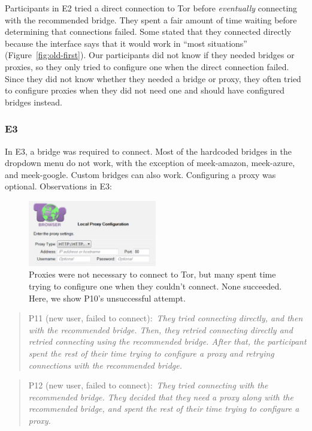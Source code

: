 \documentclass[USenglish,oneside,twocolumn]{article}
\newcommand{\pquote}[2]{
\begin{quotation}
\noindent #1:~\textit{#2}
\end{quotation}
}
\begin{document}
Participants in E2 tried a direct connection to Tor before {\it eventually} connecting with the recommended bridge.
They spent a fair amount of time waiting before determining that connections failed. Some stated that they connected directly because the interface says that it would work in ``most situations'' (Figure~\ref{fig:old-first}). Our participants did not know if they needed bridges or proxies, so they only tried to configure one when the direct connection failed. Since they did not know whether they needed a bridge or proxy, they often tried to configure proxies when they did not need one and should have configured bridges instead.  

\subsubsection{E3}
In E3, a bridge was required to connect. Most of the hardcoded bridges in the dropdown menu do not work, with the exception of meek-amazon, meek-azure, and meek-google. Custom bridges can also work. Configuring a proxy was optional.
Observations in E3: 

\begin{figure}[t]
\centering
\includegraphics[width=0.5\textwidth]{P8-proxy-attempt.png}
\caption{
Proxies were not necessary to connect to Tor, but many spent time trying to configure one when they couldn't connect. None succeeded. Here, we show P10's unsuccessful attempt. 
}
\label{fig:proxy-attempt}
\end{figure}

\pquote{P11 (new user, failed to connect)}{They tried connecting directly, and then with the recommended bridge. Then, they retried connecting directly and retried connecting using the recommended bridge. After that, the participant spent the rest of their time trying to configure a proxy and retrying connections with the recommended bridge.}

\pquote{P12 (new user, failed to connect)}{They tried connecting with the recommended bridge. They decided that they need a proxy along with the recommended bridge, and spent the rest of their time trying to configure a proxy.}
\end{document}
